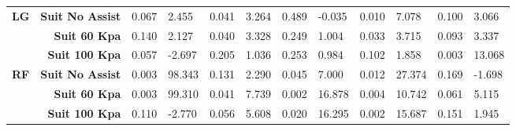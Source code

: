 \documentclass[letterpaper, 10 pt, conference]{ieeeconf}  %
\begin{document}
\begin{table*}[]
\begin{tabular}{@{}lrllllllllll@{}}
		\textbf{LG}                          & \textbf{Suit No Assist}                 & 0.067                                & 2.455                                & 0.041                                & 3.264                                & 0.489                                & -0.035                               & 0.010                                & 7.078                                & 0.100                                & 3.066                                \\
		\textbf{}                            & \textbf{Suit 60 Kpa}                    & 0.140                                & 2.127                                & 0.040                                & 3.328                                & 0.249                                & 1.004                                & 0.033                                & 3.715                                & 0.093                                & 3.337                                \\
		\textbf{}                            & \textbf{Suit 100 Kpa}                   & 0.057                                & -2.697                               & 0.205                                & 1.036                                & 0.253                                & 0.984                                & 0.102                                & 1.858                                & 0.003                                & 13.068                               \\ \midrule
		\textbf{RF}                          & \textbf{Suit No Assist}                 & 0.003                                & 98.343                               & 0.131                                & 2.290                                & 0.045                                & 7.000                                & 0.012                                & 27.374                               & 0.169                                & -1.698                               \\
		\textbf{}                            & \textbf{Suit 60 Kpa}                    & 0.003                                & 99.310                               & 0.041                                & 7.739                                & 0.002                                & 16.878                               & 0.004                                & 10.742                               & 0.061                                & 5.115                                \\
		\textbf{}                            & \textbf{Suit 100 Kpa}                   & 0.110                                & -2.770                               & 0.056                                & 5.608                                & 0.020                                & 16.295                               & 0.002                                & 15.687                               & 0.151                                & 1.945                                \\ \midrule

\end{tabular}
\end{table*}
\end{document}
